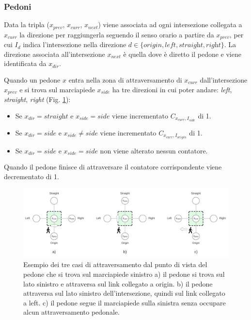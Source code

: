 \newpage
\subsubsection{Pedoni}

Data la tripla ($x_{prev}$, $x_{curr}$, $x_{next}$) viene associata ad ogni intersezione collegata a $x_{curr}$ la direzione per raggiungerla seguendo il senso orario a partire da $x_{prev}$,
per cui $I_d$ indica l'intersezione nella direzione $d \in \{\textit{origin}, \textit{left}, \textit{straight}, \textit{right}\}$.
%
La direzione associata all'intersezione $x_{next}$ è quella dove è diretto il pedone e viene identificata da $x_{dir}$.

Quando un pedone $x$ entra nella zona di attraversamento di $x_{curr}$ dall'intersezione $x_{prev}$ e si trova sul marciapiede $x_{side}$
ha tre direzioni in cui poter andare: \textit{left}, \textit{straight}, \textit{right} (Fig. \ref{fig:pedestria-crossing}):
\begin{itemize}
    \item Se $x_{dir} = \textit{straight}$ e $x_{side} = \textit{side}$ viene incrementato $C_{x_{curr}, I_{\textit{side}}}$ di 1.
    \item Se $x_{dir} = \textit{side}$ e $x_{side} \neq \textit{side}$ viene incrementato $C_{x_{curr}, I_{\textit{origin}}}$ di 1.
    \item Se  $x_{dir} = \textit{side}$ e $x_{side} = \textit{side}$ non viene alterato nessun contatore.
\end{itemize}

Quando il pedone finisce di attraversare il contatore corrispondente viene decrementato di 1.


\begin{figure}[ht]
    \centering
    \includegraphics[width=\textwidth]{images/pedestrian_crossing}
    \caption{
        Esempio dei tre casi di attraversamento dal punto di vista del pedone che si trova sul marciapiede sinistro
        a) il pedone si trova sul lato sinistro e attraversa sul link collegato a origin.
        b) il pedone attraversa sul lato sinistro dell'intersezione, quindi sul link collegato a left.
        c) il pedone segue il marciapiede sulla sinistra senza occupare alcun attraversamento pedonale.
    }
    \label{fig:pedestria-crossing}
\end{figure}


